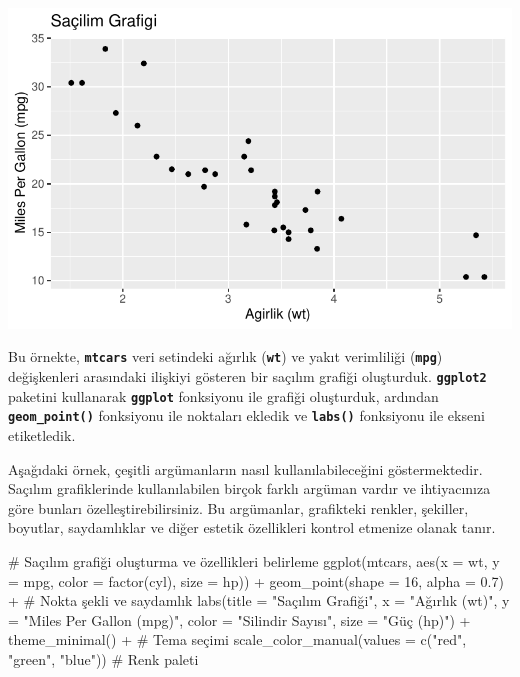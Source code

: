 \documentclass[
  letterpaper,
  DIV=11,
  numbers=noendperiod]{scrreprt}
\newenvironment{Shaded}{\begin{snugshade}}{\end{snugshade}}
\newcommand{\AttributeTok}[1]{\textcolor[rgb]{0.40,0.45,0.13}{#1}}
\newcommand{\CommentTok}[1]{\textcolor[rgb]{0.37,0.37,0.37}{#1}}
\newcommand{\DecValTok}[1]{\textcolor[rgb]{0.68,0.00,0.00}{#1}}
\newcommand{\FloatTok}[1]{\textcolor[rgb]{0.68,0.00,0.00}{#1}}
\newcommand{\FunctionTok}[1]{\textcolor[rgb]{0.28,0.35,0.67}{#1}}
\newcommand{\NormalTok}[1]{\textcolor[rgb]{0.00,0.23,0.31}{#1}}
\newcommand{\SpecialCharTok}[1]{\textcolor[rgb]{0.37,0.37,0.37}{#1}}
\newcommand{\StringTok}[1]{\textcolor[rgb]{0.13,0.47,0.30}{#1}}
\begin{document}
\includegraphics{ggplot2_files/figure-pdf/unnamed-chunk-10-1.pdf}

Bu örnekte, \textbf{\texttt{mtcars}} veri setindeki ağırlık
(\textbf{\texttt{wt}}) ve yakıt verimliliği (\textbf{\texttt{mpg}})
değişkenleri arasındaki ilişkiyi gösteren bir saçılım grafiği
oluşturduk. \textbf{\texttt{ggplot2}} paketini kullanarak
\textbf{\texttt{ggplot}} fonksiyonu ile grafiği oluşturduk, ardından
\textbf{\texttt{geom\_point()}} fonksiyonu ile noktaları ekledik ve
\textbf{\texttt{labs()}} fonksiyonu ile ekseni etiketledik.

Aşağıdaki örnek, çeşitli argümanların nasıl kullanılabileceğini
göstermektedir. Saçılım grafiklerinde kullanılabilen birçok farklı
argüman vardır ve ihtiyacınıza göre bunları özelleştirebilirsiniz. Bu
argümanlar, grafikteki renkler, şekiller, boyutlar, saydamlıklar ve
diğer estetik özellikleri kontrol etmenize olanak tanır.

\begin{Shaded}
\begin{Highlighting}[]
\CommentTok{\# Saçılım grafiği oluşturma ve özellikleri belirleme}
\FunctionTok{ggplot}\NormalTok{(mtcars, }\FunctionTok{aes}\NormalTok{(}\AttributeTok{x =}\NormalTok{ wt, }\AttributeTok{y =}\NormalTok{ mpg, }\AttributeTok{color =} \FunctionTok{factor}\NormalTok{(cyl), }\AttributeTok{size =}\NormalTok{ hp)) }\SpecialCharTok{+}
  \FunctionTok{geom\_point}\NormalTok{(}\AttributeTok{shape =} \DecValTok{16}\NormalTok{, }\AttributeTok{alpha =} \FloatTok{0.7}\NormalTok{) }\SpecialCharTok{+}  \CommentTok{\# Nokta şekli ve saydamlık}
  \FunctionTok{labs}\NormalTok{(}\AttributeTok{title =} \StringTok{"Saçılım Grafiği"}\NormalTok{,}
       \AttributeTok{x =} \StringTok{"Ağırlık (wt)"}\NormalTok{,}
       \AttributeTok{y =} \StringTok{"Miles Per Gallon (mpg)"}\NormalTok{,}
       \AttributeTok{color =} \StringTok{"Silindir Sayısı"}\NormalTok{,}
       \AttributeTok{size =} \StringTok{"Güç (hp)"}\NormalTok{) }\SpecialCharTok{+}
  \FunctionTok{theme\_minimal}\NormalTok{() }\SpecialCharTok{+}  \CommentTok{\# Tema seçimi}
  \FunctionTok{scale\_color\_manual}\NormalTok{(}\AttributeTok{values =} \FunctionTok{c}\NormalTok{(}\StringTok{"red"}\NormalTok{, }\StringTok{"green"}\NormalTok{, }\StringTok{"blue"}\NormalTok{))  }\CommentTok{\# Renk paleti}
\end{Highlighting}
\end{Shaded}
\end{document}
